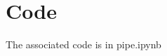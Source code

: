 \documentclass[12pt, letterpaper]{article}
\begin{document}

\section{Code} %

The associated code is in pipe.ipynb
\end{document}
